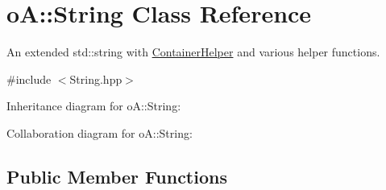 \hypertarget{classo_a_1_1_string}{}\section{oA\+:\+:String Class Reference}
\label{classo_a_1_1_string}


An extended std\+::string with \mbox{\hyperlink{classo_a_1_1_container_helper}{Container\+Helper}} and various helper functions.  




{\ttfamily \#include $<$String.\+hpp$>$}



Inheritance diagram for oA\+:\+:String\+:


Collaboration diagram for oA\+:\+:String\+:
\subsection*{Public Member Functions}
